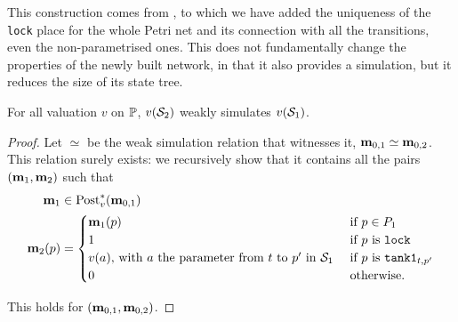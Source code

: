 This construction comes from \cite{David17}, to which we have added the uniqueness of the \texttt{lock} place for the whole Petri net and its connection with all the transitions, even the non-parametrised ones.
This does not fundamentally change the properties of the newly built network, in that it also provides a simulation, but it reduces the size of its state tree.

\begin{lemm}
  \label{theo:simulation-p-ppn-postt-ppn}
  For all valuation $v$ on $\parameters$, $v(\namePPN[2])$ weakly simulates $v(\namePPN[1])$.
\end{lemm}

\begin{proof}
  Let $\simeq$ be the weak simulation relation that witnesses it, \ie $\mar_{0,1} \simeq \mar_{0,2}$.
  This relation surely exists: we recursively show that it contains all the pairs $(\mar_1, \mar_2)$ such that
  \begin{align*}
    \mar_1 &\in \posts[\val]{\mar_{0,1}}\\
    \mar_2(p) &= \begin{cases}
        \mar_1(p) &\text{ if } p \in \places_1\\
        1         &\text{ if } p \text{ is } \mathtt{lock} \\
        \val[a]\text{, with $a$ the parameter from $t$ to $p'$ in $\namePPN[1]$} &\text{ if $p$ is }\mathtt{tank1}_{t,p'} \\
        0 &\text{ otherwise.}
      \end{cases}
  \end{align*}

  This holds for $(\mar_{0,1}, \mar_{0,2})$.


\end{proof}
